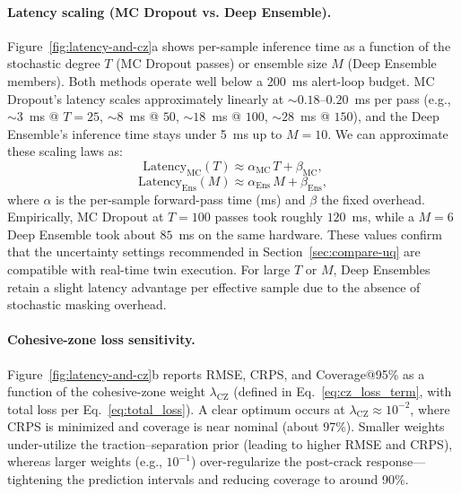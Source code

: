 \documentclass{article}
\begin{document}
\paragraph{Latency scaling (MC Dropout vs. Deep Ensemble).} Figure~\ref{fig:latency-and-cz}a shows per-sample inference time as a function of the stochastic degree $T$ (MC Dropout passes) or ensemble size $M$ (Deep Ensemble members). Both methods operate well below a 200~ms alert-loop budget. MC Dropout’s latency scales approximately linearly at $\sim\!0.18$–$0.20$~ms per pass (e.g., $\sim\!3$~ms @ $T=25$, $\sim\!8$~ms @ $50$, $\sim\!18$~ms @ $100$, $\sim\!28$~ms @ $150$), and the Deep Ensemble’s inference time stays under 5~ms up to $M=10$. We can approximate these scaling laws as:
\begin{equation}
    \mathrm{Latency}_{\mathrm{MC}}(T) \approx \alpha_{\mathrm{MC}} \, T + \beta_{\mathrm{MC}},
    \label{eq:latency_mc}
\end{equation}
\begin{equation}
    \mathrm{Latency}_{\mathrm{Ens}}(M) \approx \alpha_{\mathrm{Ens}} \, M + \beta_{\mathrm{Ens}},
    \label{eq:latency_ens}
\end{equation}
where $\alpha$ is the per-sample forward-pass time (ms) and $\beta$ the fixed overhead. Empirically, MC Dropout at $T=100$ passes took roughly $120$~ms, while a $M=6$ Deep Ensemble took about $85$~ms on the same hardware. These values confirm that the uncertainty settings recommended in Section~\ref{sec:compare-uq} are compatible with real-time twin execution. For large $T$ or $M$, Deep Ensembles retain a slight latency advantage per effective sample due to the absence of stochastic masking overhead.

\paragraph{Cohesive-zone loss sensitivity.} Figure~\ref{fig:latency-and-cz}b reports RMSE, CRPS, and Coverage@95\% as a function of the cohesive-zone weight $\lambda_{\mathrm{CZ}}$ (defined in Eq.~\eqref{eq:cz_loss_term}, with total loss per Eq.~\eqref{eq:total_loss}). A clear optimum occurs at $\lambda_{\mathrm{CZ}}\approx 10^{-2}$, where CRPS is minimized and coverage is near nominal (about 97\%). Smaller weights under-utilize the traction–separation prior (leading to higher RMSE and CRPS), whereas larger weights (e.g., $10^{-1}$) over-regularize the post-crack response—tightening the prediction intervals and reducing coverage to around 90\%. 
\end{document}
